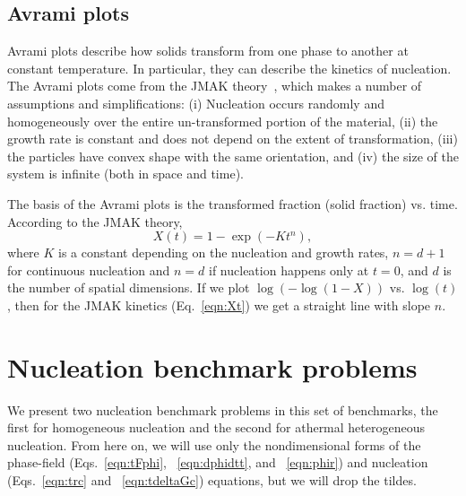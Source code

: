 \documentclass[preprint,12pt]{elsarticle}
\begin{document}
\subsection{Avrami plots}
Avrami plots describe how solids transform from one phase to another at constant temperature. In particular, they can describe the kinetics of nucleation. The Avrami plots come from the JMAK theory~\cite{johnson1939reaction,avrami1939kinetics,avrami1940kinetics,avrami1941granulation,kolmogorov1937izv}, which makes a number of %
assumptions and simplifications: (i)  Nucleation occurs randomly and homogeneously over the entire un-transformed portion of the material, (ii) the growth rate is constant and does not depend on the extent of transformation, (iii) the particles have convex shape with the same orientation, and (iv) the size of the system is infinite (both in space and time).

The basis of the Avrami plots is the transformed fraction (solid fraction) vs. time. According to the JMAK theory,
\begin{equation}
    X(t)=1-\exp (-Kt^n),
    \label{eqn:Xt}
\end{equation}
where $K$ is a constant depending on the nucleation and growth rates, $n=d+1$ for continuous nucleation and $n=d$ if nucleation happens only at $t=0$, and $d$ is the number of spatial dimensions. If we plot $\log(-\log(1-X))$ vs. $\log(t)$, then for the JMAK kinetics (Eq.~\ref{eqn:Xt}) we get a straight line with slope $n$.

\section{Nucleation benchmark problems}

We present two nucleation benchmark problems in this set of benchmarks, the first for homogeneous nucleation and the second for athermal heterogeneous nucleation. From here on, we will use only the nondimensional forms of the phase-field (Eqs.~\ref{eqn:tFphi}, ~\ref{eqn:dphidtt}, and ~\ref{eqn:phir}) and nucleation (Eqs.~\ref{eqn:trc} and  ~\ref{eqn:tdeltaGc}) equations, but we will drop the tildes. %
\end{document}

